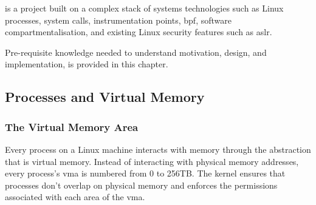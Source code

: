 



\af is a project built on a complex stack of systems technologies such as Linux
processes, system calls, instrumentation points, \ac{bpf}, software
compartmentalisation, and existing Linux security features such as \ac{aslr}.

Pre-requisite knowledge needed to understand \afg motivation, design, and
implementation, is provided in this chapter. 

\subsection{Processes and Virtual Memory}

\subsubsection{The Virtual Memory Area}


Every process on a Linux machine interacts with memory through the abstraction
that is virtual memory. Instead of interacting with physical memory addresses,
every process's \ac{vma} is numbered from 0 to 256TB. The kernel ensures that processes don't overlap on physical memory and
enforces the permissions associated with each area of the \ac{vma}.

